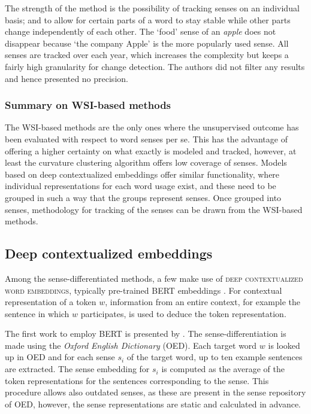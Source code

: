\documentclass[output=paper]{langsci/langscibook}
\begin{document}
The strength of the method is the possibility of tracking senses on an individual basis; and to allow for certain parts of a word to stay stable while other parts change independently of each other. The `food' sense of an \textit{apple} does not disappear because `the company Apple' is the more popularly used sense.  All senses are tracked over each year, which increases the complexity but keeps a fairly high granularity for change detection. The authors did not filter any results and hence presented no precision. 

\subsubsection{Summary on WSI-based methods} The WSI-based methods are the only ones where the unsupervised outcome has been evaluated with respect to word senses per se. This has the advantage of offering a higher certainty on what exactly is modeled and tracked, however, at least the curvature clustering algorithm offers low coverage of senses.
Models based on deep contextualized embeddings offer similar functionality, where individual representations for each word usage exist, and these need to be grouped in such a way that the groups represent senses. Once grouped into senses, methodology for tracking of the senses can be drawn from the WSI-based methods.  

\subsection{Deep contextualized embeddings} \label{subs:deepmodels}
Among the sense-differentiated methods, a few make use of \textsc{deep contextualized word embeddings}, typically pre-trained BERT embeddings \citep{devlin-etal-2019-bert}. For contextual representation of a token $w$, information from an entire context, for example the sentence in which $w$ participates, is used to deduce the token representation. 

The first work to employ BERT is presented by  \citet{hu-etal-2019-diachronic}. The sense-differentiation is made using the \emph{Oxford English Dictionary} (OED). Each target word $w$ is looked up in OED and for each sense $s_i$ of the target word, up to ten example sentences are extracted. The sense embedding for $s_i$ is computed as the average of the token representations for the sentences corresponding to the sense. This procedure allows also outdated senses, as these are present in the sense repository of OED, however, the sense representations are static and calculated in advance. 
\end{document}
